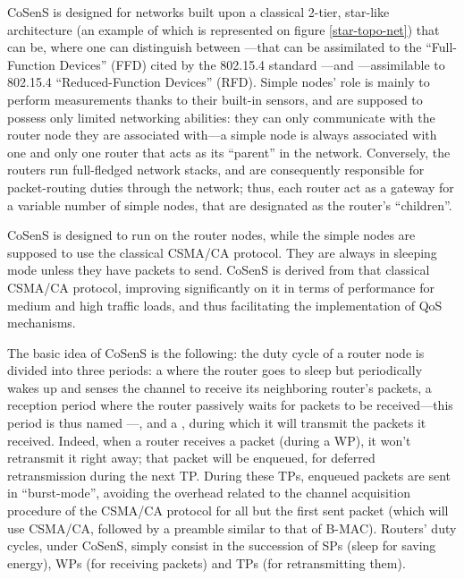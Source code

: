 \documentclass[12pt,twoside,a4paper]{article}
\begin{document}
CoSenS is designed for networks built upon a classical 2-tier, star-like
architecture (an example of which is represented on figure \ref{star-topo-net})
that can be, where one can distinguish between ---that
can be assimilated to the ``Full-Function Devices'' (FFD) cited by
the 802.15.4 standard \cite{std802154}---and ---assimilable to 802.15.4 ``Reduced-Function Devices'' (RFD).
Simple nodes' role is mainly to perform measurements thanks to their
built-in sensors, and are supposed to possess only limited networking
abilities: they can only communicate with the router node they are
associated with---a simple node is always associated with one and only
one router that acts as its ``parent'' in the network. Conversely,
the routers run full-fledged network stacks, and are consequently
responsible for packet-routing duties through the network; thus,
each router act as a gateway for a variable number of simple nodes,
that are designated as the router's ``children''.

CoSenS is designed to run on the router nodes, while the simple nodes
are supposed to use the classical CSMA/CA protocol. They are always
in sleeping mode unless they have packets to send.
CoSenS is derived from that classical CSMA/CA protocol, improving
significantly on it in terms of performance for medium and high traffic
loads, and thus facilitating the implementation of QoS mechanisms.

The basic idea of CoSenS is the following: the duty cycle of a router node
is divided into three periods: a  where the router
goes to sleep but periodically wakes up and senses the channel to receive
its neighboring router's packets, a reception period where the router
passively waits for packets to be received---this period is thus named
---, and a , during
which it will transmit the packets it received. Indeed, when a router
receives a packet (during a WP), it won't retransmit it right away;
that packet will be enqueued, for deferred retransmission during
the next TP. During these TPs, enqueued packets are sent in ``burst-mode'',
avoiding the overhead related to the channel acquisition procedure of the
CSMA/CA protocol for all but the first sent packet (which will use CSMA/CA,
followed by a preamble similar to that of B-MAC). Routers' duty cycles,
under CoSenS, simply consist in the succession of SPs (sleep for saving
energy), WPs (for receiving packets) and TPs (for retransmitting them).
\end{document}

